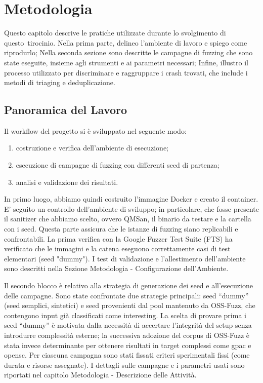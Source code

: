 \chapter{Metodologia}

Questo capitolo descrive le pratiche utilizzate durante lo svolgimento di questo tirocinio. Nella prima parte, delineo l'ambiente di lavoro e spiego come riprodurlo; Nella seconda sezione sono descritte le campagne di fuzzing che sono state eseguite, insieme agli strumenti e ai parametri necessari; Infine, illustro il processo utilizzato per discriminare e raggruppare i crash trovati, che include i metodi di triaging e deduplicazione.


\section{Panoramica del Lavoro}

Il workflow del progetto si è sviluppato nel seguente modo:

\begin{enumerate}
  \item costruzione e verifica dell'ambiente di esecuzione;
  \item esecuzione di campagne di fuzzing con differenti seed di partenza;
  \item analisi e validazione dei risultati. 
\end{enumerate}

In primo luogo, abbiamo quindi costruito l'immagine Docker e creato il container. E' seguito un controllo dell'ambiente di sviluppo; in particolare, che fosse presente il sanitizer che abbiamo scelto, ovvero QMSan, il binario da testare e la cartella con i seed. 
Questa parte assicura che le istanze di fuzzing siano replicabili e confrontabili.  La prima verifica con la Google Fuzzer Test Suite (FTS) ha verificato che le immagini e la catena eseguono correttamente casi di test elementari (seed "dummy").  I test di validazione e l'allestimento dell'ambiente sono descritti nella Sezione Metodologia - Configurazione dell'Ambiente.

Il secondo blocco è relativo alla strategia di generazione dei seed e all’esecuzione delle campagne.
Sono state confrontate due strategie principali: seed “dummy” (seed semplici, sintetici) e seed provenienti dal pool mantenuto da OSS-Fuzz, che contengono input già classificati come interesting. 
La scelta di provare prima i seed “dummy” è motivata dalla necessità di accertare l’integrità del setup senza introdurre complessità esterne; la successiva adozione del corpus di OSS-Fuzz è stata invece determinante per ottenere risultati in target complessi come gpac e opensc.
Per ciascuna campagna sono stati fissati criteri sperimentali fissi (come durata e risorse assegnate).
I dettagli sulle campagne e i parametri usati sono riportati nel capitolo Metodologia - Descrizione delle Attività.

